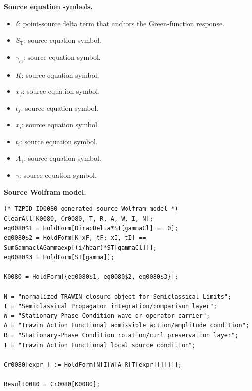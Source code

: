 \begin{minipage}[t]{0.49\linewidth}
\begingroup
\small
\raggedright
\textbf{Source equation symbols.}\par
\begin{itemize}[leftmargin=1.35em,itemsep=1pt,topsep=1pt,parsep=0pt]
    \item $\delta$: point-source delta term that anchors the Green-function response.
    \item $S_{\mathrm{T}}$: source equation symbol.
    \item $\gamma_{\mathrm{cl}}$: source equation symbol.
    \item $K$: source equation symbol.
    \item $x_f$: source equation symbol.
    \item $t_f$: source equation symbol.
    \item $x_i$: source equation symbol.
    \item $t_i$: source equation symbol.
    \item $A_{\gamma}$: source equation symbol.
    \item $\gamma$: source equation symbol.
\end{itemize}
\endgroup
\end{minipage}\hfill
\begin{minipage}[t]{0.47\linewidth}
\begingroup
\scriptsize
\raggedright
\textbf{Source Wolfram model.}\par
\begin{Verbatim}[fontsize=\tiny,breaklines=true,breakanywhere=true]
(* TZPID ID0080 generated source Wolfram model *)
ClearAll[K0080, Cr0080, T, R, A, W, I, N];
eq0080$1 = HoldForm[DiracDelta*ST[gammaCl] == 0];
eq0080$2 = HoldForm[K[xF, tF; xI, tI] == SumGammaclAGammaexp[(i/hbar)*ST[gammaCl]]];
eq0080$3 = HoldForm[ST[gamma]];

K0080 = HoldForm[{eq0080$1, eq0080$2, eq0080$3}];

N = "normalized TRAWIN closure object for Semiclassical Limits";
I = "Semiclassical Propagator integration/comparison layer";
W = "Stationary-Phase Condition wave or operator carrier";
A = "Trawin Action Functional admissible action/amplitude condition";
R = "Stationary-Phase Condition rotation/curl preservation layer";
T = "Trawin Action Functional local source condition";

Cr0080[expr_] := HoldForm[N[I[W[A[R[T[expr]]]]]]];

Result0080 = Cr0080[K0080];
\end{Verbatim}
\endgroup
\end{minipage}

